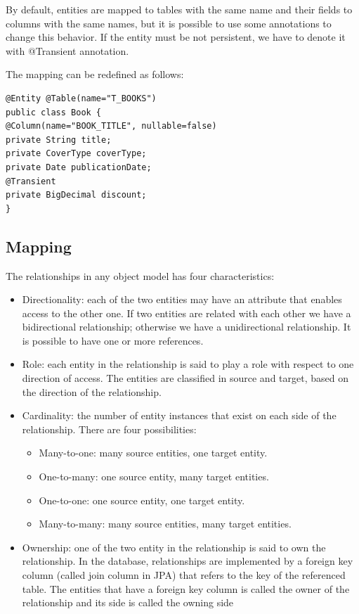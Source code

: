     By default, entities are mapped to tables with the same name and their fields to columns with the same names, but it is possible to use some annotations 
    to change this behavior. If the entity must be not persistent, we have to denote it with @Transient annotation. 
    \begin{example}
        The mapping can be redefined as follows: 
        \begin{lstlisting}[style=Java]
@Entity @Table(name="T_BOOKS")
public class Book {
@Column(name="BOOK_TITLE", nullable=false)
private String title;
private CoverType coverType;
private Date publicationDate;
@Transient
private BigDecimal discount;
}
        \end{lstlisting}
    \end{example}

    \subsection*{Mapping}
    The relationships in any object model has four characteristics:
    \begin{itemize}
        \item Directionality: each of the two entities may have an attribute that enables access to the other one. If two entities are related with each other we have 
            a bidirectional relationship; otherwise we have a unidirectional relationship. It is possible to have one or more references. 
        \item Role: each entity in the relationship is said to play a role with respect to one direction of access. The entities are classified in source and target,
            based on the direction of the relationship. 
        \item Cardinality: the number of entity instances that exist on each side of the relationship. There are four possibilities: 
            \begin{itemize}
                \item Many-to-one: many source entities, one target entity.
                \item One-to-many: one source entity, many target entities.
                \item One-to-one: one source entity, one target entity.
                \item Many-to-many: many source entities, many target entities.
            \end{itemize}
        \item Ownership: one of the two entity in the relationship is said to own the relationship. In the database, relationships are implemented by a foreign key 
            column (called join column in JPA) that refers to the key of the referenced table. The entities that have  a foreign key column is called the owner of 
            the relationship and its side is called the owning side
    \end{itemize}


